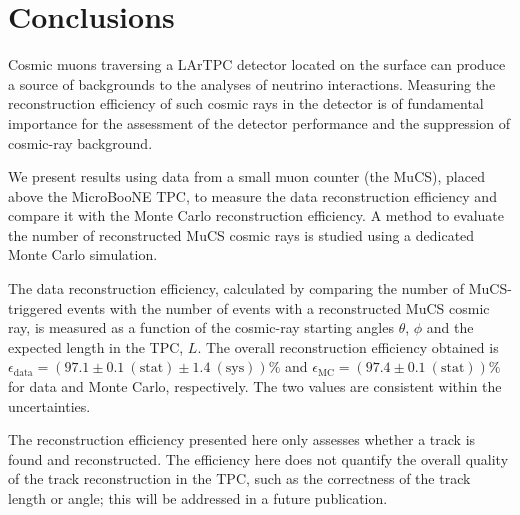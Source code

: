 \documentclass[a4paper,11pt]{article}
\begin{document}
\section{Conclusions}
Cosmic muons traversing a LArTPC detector located on the surface can produce a source of backgrounds to the analyses of neutrino interactions. Measuring the reconstruction efficiency of such cosmic rays in the detector is of fundamental importance for the assessment of the detector performance and the suppression of cosmic-ray background.

We present results using data from a small muon counter (the MuCS), placed above the MicroBooNE TPC, to measure the data reconstruction efficiency and compare it with the Monte Carlo reconstruction efficiency.
A method to evaluate the number of reconstructed MuCS cosmic rays is studied using a dedicated Monte Carlo simulation.

The data reconstruction efficiency, calculated by comparing the number of MuCS-triggered events with the number of events with a reconstructed MuCS cosmic ray, is measured as a function of the cosmic-ray starting angles $\theta$, $\phi$ and the expected length in the TPC, $L$. The overall reconstruction efficiency obtained is $\epsilon_{\mathrm{data}}=(97.1 \pm 0.1~\mathrm{(stat)} \pm 1.4~\mathrm{(sys)})\%$ and $\epsilon_{\mathrm{MC}} = (97.4 \pm 0.1~\mathrm{(stat)})\%$ for data and Monte Carlo, respectively. The two values are consistent within the uncertainties.

The reconstruction efficiency presented here only assesses whether a track is found and reconstructed. The efficiency here does not quantify the overall quality of the track reconstruction in the TPC, such as the correctness of the track length or angle; this will be addressed in a future publication.

\end{document}

